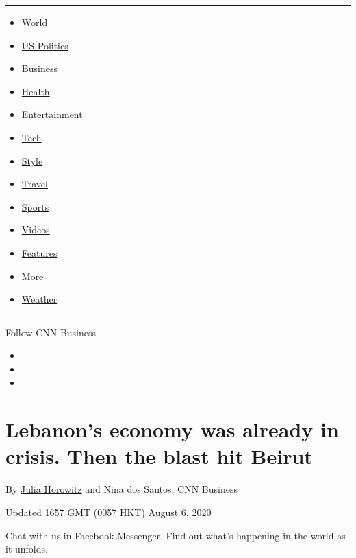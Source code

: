 \begin{center}\rule{0.5\linewidth}{\linethickness}\end{center}

\begin{itemize}
\tightlist
\item
  \href{/world}{World}
\item
  \href{/politics}{US Politics}
\item
  \href{/business}{Business}
\item
  \href{/health}{Health}
\item
  \href{/entertainment}{Entertainment}
\item
  \href{/business/tech}{Tech}
\item
  \href{/style}{Style}
\item
  \href{/travel}{Travel}
\item
  \href{/sport}{Sports}
\item
  \href{/videos}{Videos}
\item
  \href{/specials}{Features}
\item
  \href{/more}{More}
\item
  \href{/weather}{Weather}
\end{itemize}

\begin{center}\rule{0.5\linewidth}{\linethickness}\end{center}

Follow CNN Business

\begin{itemize}
\item
\item
\item
\end{itemize}

\hypertarget{lebanons-economy-was-already-in-crisis-then-the-blast-hit-beirut}{%
\section{Lebanon's economy was already in crisis. Then the blast hit
Beirut}\label{lebanons-economy-was-already-in-crisis-then-the-blast-hit-beirut}}

By \href{/profiles/julia-horowitz}{Julia Horowitz} and Nina dos Santos,
CNN Business

Updated 1657 GMT (0057 HKT) August 6, 2020

Chat with us in Facebook Messenger. Find out what's happening in the
world as it unfolds.

